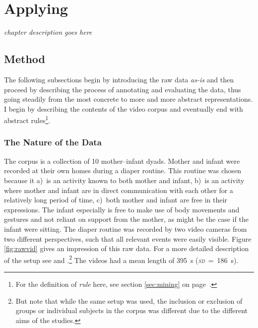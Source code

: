 
\chapter{Applying \fpmupper}
\label{ch:mining}
\emph{chapter description goes here}

\section{Method}
The following subsections begin by introducing the raw data \emph{as-is} and then proceed by describing the process of annotating and evaluating the data, thus going steadily from the most concrete to more and more abstract representations. I begin by describing the contents of the video corpus and eventually end with abstract rules\footnote{For the definition of \emph{rule} here, see section \ref{sec:mining} on page~\pageref{sec:mining}.}.

\subsection{The Nature of the Data}
The corpus is a collection of 10 mother--infant dyads. Mother and infant were recorded at their own homes during a diaper routine. This routine was chosen because it a)~is an activity known to both mother and infant, b)~is an activity where mother and infant are in direct communication with each other for a relatively long period of time, c)~both mother and infant are free in their expressions. The infant especially is free to make use of body movements and gestures and not reliant on support from the mother, as might be the case if the infant were sitting. The diaper routine was recorded by two video cameras from two different perspectives, such that all relevant events were easily visible. Figure \ref{fig:rawvid} gives an impression of this raw data. For a more detailed description of the setup see \citet[]{nomikou17} and \citet[]{nomikou11}.\footnote{But note that while the same setup was used, the inclusion or exclusion of groups or individual subjects in the corpus was different due to the different aims of the studies.} The videos had a mean length of 395~s (\emph{\textsc{sd}}~=~186~s).

